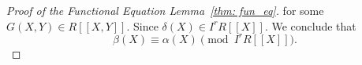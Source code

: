 \begin{proof}[Proof of the Functional Equation Lemma~\ref{thm: fun_eq}]
for some $G(X, Y) \in R[\![X, Y]\!]$. Since $\delta(X) \in I^r R[\![X]\!]$.
We conclude that
\[\beta(X) \equiv \alpha(X) \pmod{I^r R[\![X]\!]}.\]













\end{proof}
